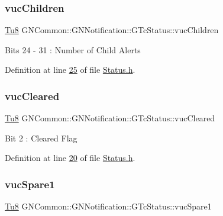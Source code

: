 \subsubsection{\texorpdfstring{vuc\+Children}{vucChildren}}
{\footnotesize\ttfamily \mbox{\hyperlink{namespace_g_n_common_a7939e251ddbf5d3a31832dcfdc8bde39}{Tu8}} G\+N\+Common\+::\+G\+N\+Notification\+::\+G\+Tc\+Status\+::vuc\+Children}

Bits 24 -\/ 31 \+: Number of Child Alerts 

Definition at line \mbox{\hyperlink{_status_8h_source_l00025}{25}} of file \mbox{\hyperlink{_status_8h_source}{Status.\+h}}.

\mbox{\label{class_g_n_common_1_1_g_n_notification_1_1_g_tc_status_a1aaee7841edfccb69229a59894a5cac0}} 
\subsubsection{\texorpdfstring{vuc\+Cleared}{vucCleared}}
{\footnotesize\ttfamily \mbox{\hyperlink{namespace_g_n_common_a7939e251ddbf5d3a31832dcfdc8bde39}{Tu8}} G\+N\+Common\+::\+G\+N\+Notification\+::\+G\+Tc\+Status\+::vuc\+Cleared}

Bit 2 \+: Cleared Flag 

Definition at line \mbox{\hyperlink{_status_8h_source_l00020}{20}} of file \mbox{\hyperlink{_status_8h_source}{Status.\+h}}.

\mbox{\label{class_g_n_common_1_1_g_n_notification_1_1_g_tc_status_a7c3f5f2f301bb9305a7c08792760247d}} 
\subsubsection{\texorpdfstring{vuc\+Spare1}{vucSpare1}}
{\footnotesize\ttfamily \mbox{\hyperlink{namespace_g_n_common_a7939e251ddbf5d3a31832dcfdc8bde39}{Tu8}} G\+N\+Common\+::\+G\+N\+Notification\+::\+G\+Tc\+Status\+::vuc\+Spare1}


